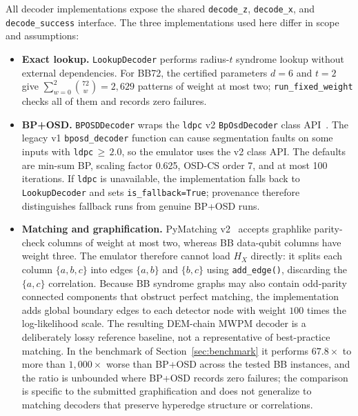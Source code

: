 \documentclass[pdflatex,sn-mathphys-num]{sn-jnl}
\theoremstyle{thmstyleone}
\theoremstyle{thmstyletwo}
\theoremstyle{thmstylethree}
\begin{document}
All decoder implementations expose the shared \texttt{decode\_z}, \texttt{decode\_x}, and \texttt{decode\_success} interface. The three implementations used here differ in scope and assumptions:
\begin{itemize}[leftmargin=1.6em,itemsep=2pt]
  \item \textbf{Exact lookup.} \texttt{LookupDecoder} performs radius-$t$ syndrome lookup without external dependencies. For BB72, the certified parameters $d=6$ and $t=2$ give $\sum_{w=0}^{2}\binom{72}{w}=2{,}629$ patterns of weight at most two; \texttt{run\_fixed\_weight} checks all of them and records zero failures.
  \item \textbf{BP+OSD.} \texttt{BPOSDDecoder} wraps the \texttt{ldpc} v2 \texttt{BpOsdDecoder} class API~\cite{ldpcPackage}. The legacy v1 \texttt{bposd\_decoder} function can cause segmentation faults on some inputs with \texttt{ldpc}$\,\ge\,2.0$, so the emulator uses the v2 class API. The defaults are min-sum BP, scaling factor 0.625, OSD-CS order 7, and at most 100 iterations. If \texttt{ldpc} is unavailable, the implementation falls back to \texttt{LookupDecoder} and sets \texttt{is\_fallback=True}; provenance therefore distinguishes fallback runs from genuine BP+OSD runs.
  \item \textbf{Matching and graphification.} PyMatching v2~\cite{Higgott2023} accepts graphlike parity-check columns of weight at most two, whereas BB data-qubit columns have weight three. The emulator therefore cannot load $H_X$ directly: it splits each column $\{a,b,c\}$ into edges $\{a,b\}$ and $\{b,c\}$ using \texttt{add\_edge()}, discarding the $\{a,c\}$ correlation. Because BB syndrome graphs may also contain odd-parity connected components that obstruct perfect matching, the implementation adds global boundary edges to each detector node with weight $100$ times the log-likelihood scale. The resulting DEM-chain MWPM decoder is a deliberately lossy reference baseline, not a representative of best-practice matching. In the benchmark of Section~\ref{sec:benchmark} it performs $67.8\times$ to more than $1{,}000\times$ worse than BP+OSD across the tested BB instances, and the ratio is unbounded where BP+OSD records zero failures; the comparison is specific to the submitted graphification and does not generalize to matching decoders that preserve hyperedge structure or correlations.
\end{itemize}
\end{document}
